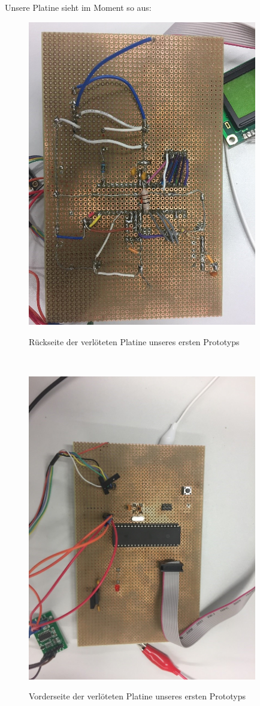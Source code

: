 Unsere Platine sieht im Moment so aus:
\begin{figure}[ht]
    \center
    \includegraphics[width=10cm]{Bilder/schaltplan-2.jpg}\\
    \caption{Rückseite der verlöteten Platine unseres ersten Prototyps}
    \label{fig:schaltplan-rueckseite}
\end{figure}\\
\begin{figure}[ht]
    \center
    \includegraphics[width=10cm]{Bilder/schaltplan-3.jpg}\\
    \caption{Vorderseite der verlöteten Platine unseres ersten Prototyps}
    \label{fig:schaltplan-vorderseite}
\end{figure}\\
